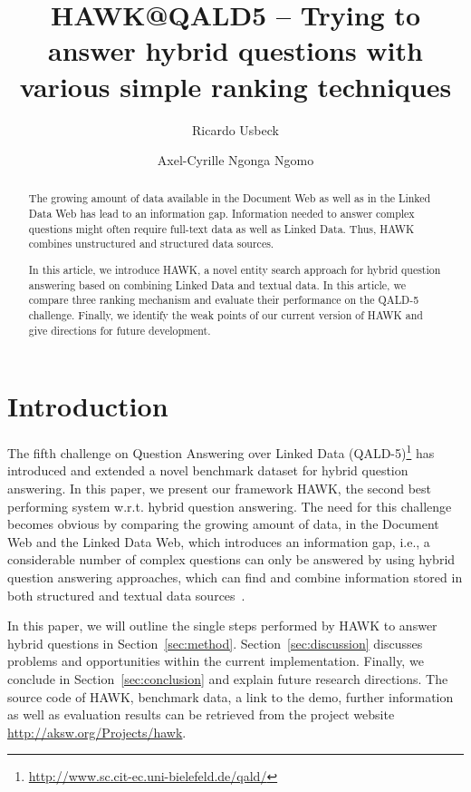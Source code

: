 \documentclass{llncs}
\begin{document}
\title{HAWK@QALD5 -- Trying to answer hybrid questions with various simple ranking techniques}
\author{
Ricardo Usbeck \and 
Axel-Cyrille Ngonga Ngomo
}


\maketitle

\begin{abstract}
The growing amount of data available in the Document Web as well as in the Linked Data Web has lead to an information gap.
Information needed to answer complex questions might often require full-text data as well as Linked Data.
Thus, HAWK combines unstructured and structured data sources.   

In this article, we introduce HAWK, a novel entity search approach for hybrid question answering based on combining Linked Data and textual data.
In this article, we compare three ranking mechanism and evaluate their performance on the QALD-5 challenge. 
Finally, we identify the weak points of our current version of HAWK and give directions for future development.
\end{abstract}


\section{Introduction}
The fifth challenge on Question Answering over Linked Data (QALD-5)\footnote{\url{http://www.sc.cit-ec.uni-bielefeld.de/qald/}} has introduced and extended a novel benchmark dataset for hybrid question answering.
In this paper, we present our framework HAWK, the second best performing system w.r.t. hybrid question answering. 
The need for this challenge becomes obvious by comparing the growing amount of data, in the Document Web and the Linked Data Web, which introduces an information gap, i.e., a considerable number of complex questions can only be answered by using hybrid question answering approaches, which can find and combine information stored in both structured and textual data sources~\cite{combiningLDandIR}.

In this paper, we will outline the single steps performed by HAWK to answer hybrid questions in Section~\ref{sec:method}.
Section~\ref{sec:discussion} discusses problems and opportunities within the current implementation.
Finally, we conclude in Section~\ref{sec:conclusion} and explain future research directions.
The source code of HAWK, benchmark data, a link to the demo, further information as well as evaluation results can be retrieved from the project website \url{http://aksw.org/Projects/hawk}.
\end{document}
